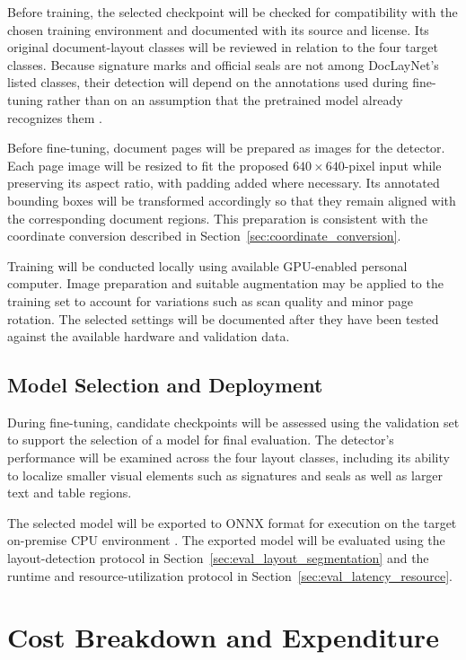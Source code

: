 Before training, the selected checkpoint will be checked for compatibility with the chosen training environment and documented with its source and license. Its original document-layout classes will be reviewed in relation to the four target classes. Because signature marks and official seals are not among DocLayNet's listed classes, their detection will depend on the annotations used during fine-tuning rather than on an assumption that the pretrained model already recognizes them \cite{ref9,docxc1}.

Before fine-tuning, document pages will be prepared as images for the detector. Each page image will be resized to fit the proposed $640\times640$-pixel input while preserving its aspect ratio, with padding added where necessary. Its annotated bounding boxes will be transformed accordingly so that they remain aligned with the corresponding document regions. This preparation is consistent with the coordinate conversion described in Section~\ref{sec:coordinate_conversion}.

Training will be conducted locally using available GPU-enabled personal computer. Image preparation and suitable augmentation may be applied to the training set to account for variations such as scan quality and minor page rotation. The selected settings will be documented after they have been tested against the available hardware and validation data.

\subsection{Model Selection and Deployment}
\label{sec:training_deployment}

During fine-tuning, candidate checkpoints will be assessed using the validation set to support the selection of a model for final evaluation. The detector's performance will be examined across the four layout classes, including its ability to localize smaller visual elements such as signatures and seals as well as larger text and table regions.

The selected model will be exported to ONNX format for execution on the target on-premise CPU environment \cite{ref32,ref33}. The exported model will be evaluated using the layout-detection protocol in Section~\ref{sec:eval_layout_segmentation} and the runtime and resource-utilization protocol in Section~\ref{sec:eval_latency_resource}.

\section{Cost Breakdown and Expenditure}
\label{sec:cost_breakdown}
\setcounter{table}{0}

